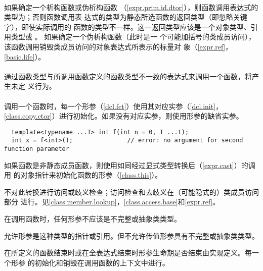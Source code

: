 \paragraph{} %
如果确定一个析构函数或伪析构函数
（\ref{expr.prim.id.dtor}），则函数调用表达式的类型为；否则函数调用表
达式的类型为静态所选函数的返回类型（即忽略关键字），即使实际调用的
函数的类型不一样。这一返回类型应该是一个对象类型、引用类型或 。
如果确定一个伪析构函数（此时是一
个可能加括号的类成员访问），该函数调用销毁类成员访问的对象表达式所表示的标量对
象（\ref{expr.ref}，\ref{basic.life}）。

\paragraph{} %
通过函数类型与所调用函数定义的函数类型不一致的表达式来调用一个函数，将产生未定
义行为。

\paragraph{} %
调用一个函数时，每一个形参（\ref{dcl.fct}）使用其对应实参（\ref{dcl.init}，
\ref{class.copy.ctor}）进行初始化。如果没有对应实参，则使用形参的缺省实参。

\begin{example}
  \begin{lstlisting}
  template<typename ...T> int f(int n = 0, T ...t);
  int x = f<int>();               // error: no argument for second function parameter
  \end{lstlisting}
\end{example}

如果函数是非静态成员函数，则使用如同经过显式类型转换后（\ref{expr.cast}）的调用
的对象指针来初始化函数的形参（\ref{class.this}）。

\begin{note}
  不对此转换进行访问或歧义检查；访问检查和去歧义在（可能隐式的）类成员访问部分
  进行。见\ref{class.member.lookup}，\ref{class.access.base}和\ref{expr.ref}。
\end{note}

在调用函数时，任何形参不应该是不完整或抽象类类型。

\begin{note}
  允许形参是这种类型的指针或引用。但不允许传值形参具有不完整或抽象类类型。
\end{note}

在所定义的函数结束时或在全表达式结束时形参生命期是否结束由实现定义。每一个形参
的初始化和销毁在调用函数的上下文中进行。

